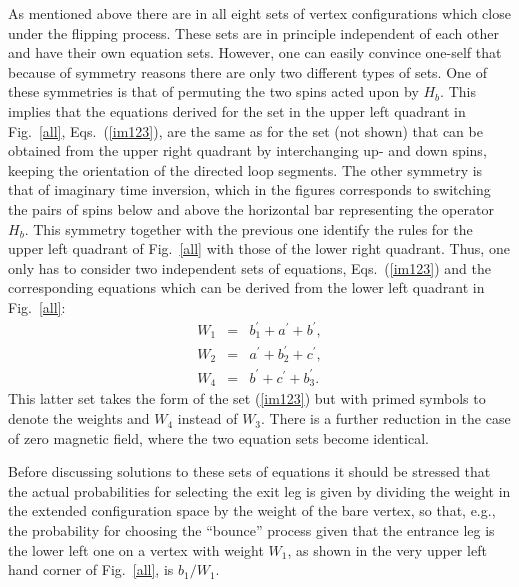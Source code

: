 \documentclass[10pt,pre,aps,twocolumn,showpacs,superscriptaddress,
floatfix]{revtex4}
\newcommand{\bea}{\begin{eqnarray}}
\newcommand{\eea}{\end{eqnarray}}
\begin{document}
As mentioned above there are in all eight sets of vertex configurations which
close under the flipping process. These sets are in principle independent 
of each other and have their own equation sets. However, one can easily 
convince one-self that because of symmetry reasons there are only two 
different types of sets. One of these symmetries is that of permuting the 
two spins acted upon by $H_b$. This implies that the equations derived for 
the set in the upper left quadrant in Fig.~\ref{all}, Eqs.~(\ref{im123}), 
are the same as for the set (not shown) that can be obtained from the upper 
right quadrant by interchanging up- and down spins, keeping the orientation 
of the directed loop segments.
The other symmetry is that of imaginary time inversion, which in the figures 
corresponds to switching the pairs of spins below and above the horizontal 
bar representing the operator $H_b$. This symmetry together with the previous
one identify the rules for the upper left quadrant of Fig.~\ref{all} with 
those of the lower right quadrant. Thus, one only has to consider two 
independent sets of equations, Eqs.~(\ref{im123}) and the corresponding 
equations which can be derived from the lower left quadrant in Fig.~\ref{all}:
\bea 
W_1 & = & b^\prime_1+a^\prime+b^\prime,  \label{detbal4} \nonumber \\
W_2 & = & a^\prime+ b^\prime _2+c^\prime, \label{detbal5} \label{im456} \\
W_4 & = & b^\prime+c^\prime+b^\prime _3. \label{detbal6}  \nonumber
\eea
This latter set takes the form of the set (\ref{im123}) but with primed 
symbols to denote the weights and $W_4$ instead of $W_3$. There is a further 
reduction in the case of zero magnetic field, where the two equation sets 
become identical.  

Before discussing solutions to these sets of equations it should be stressed
that the actual probabilities for selecting the exit leg is given by dividing 
the weight in the extended configuration space by the weight of the bare
vertex, so that, e.g., the probability for choosing the ``bounce'' process 
given that the entrance leg is the lower left one on a vertex with weight 
$W_1$, as shown in the very upper left hand corner of Fig.~\ref{all}, 
is $b_1/W_1$. 
\end{document}
